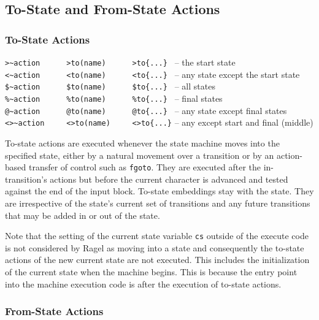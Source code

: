 \documentclass[letterpaper,11pt,oneside]{book}
\begin{document}
\subsection{To-State and From-State Actions}

\subsubsection{To-State Actions}

\def\sasp{\hspace*{40pt}}

\sasp\verb|>~action      >to(name)      >to{...} | -- the start state\\
\sasp\verb|<~action      <to(name)      <to{...} | -- any state except the start state\\
\sasp\verb|$~action      $to(name)      $to{...} | -- all states\\
\sasp\verb|%~action      %to(name)      %to{...} | -- final states\\
\sasp\verb|@~action      @to(name)      @to{...} | -- any state except final states\\
\sasp\verb|<>~action     <>to(name)     <>to{...}| -- any except start and final (middle)
\vspace{12pt}


To-state actions are executed whenever the state machine moves into the
specified state, either by a natural movement over a transition or by an
action-based transfer of control such as \verb|fgoto|. They are executed after the
in-transition's actions but before the current character is advanced and
tested against the end of the input block. To-state embeddings stay with the
state. They are irrespective of the state's current set of transitions and any
future transitions that may be added in or out of the state.

Note that the setting of the current state variable \verb|cs| outside of the
execute code is not considered by Ragel as moving into a state and consequently
the to-state actions of the new current state are not executed. This includes
the initialization of the current state when the machine begins.  This is
because the entry point into the machine execution code is after the execution
of to-state actions.

\subsubsection{From-State Actions}
\end{document}
